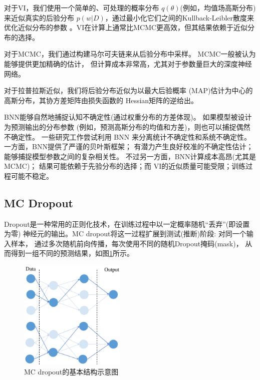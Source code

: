 对于VI，我们使用一个简单的、可处理的概率分布
$q(\theta)$(例如，均值场高斯分布)来近似真实的后验分布
$p(w|D)$，通过最小化它们之间的Kullback-Leibler散度\cite{1320776d-9e76-337e-a755-73010b6e4b64}来优化近似分布的参数
。VI在计算上通常比MCMC更高效，但其结果依赖于近似分布的选择。

对于MCMC，我们通过构建马尔可夫链来从后验分布中采样。
MCMC一般被认为能够提供更加精确的估计，
但计算成本非常高，尤其对于参数量巨大的深度神经网络。

对于拉普拉斯近似，我们将后验分布近似为以最大后验概率
(MAP)估计为中心的高斯分布，其协方差矩阵由损失函数的
Hessian矩阵的逆给出。

BNN能够自然地捕捉认知不确定性(通过权重分布的方差体现)。
如果模型被设计为预测输出的分布参数
(例如，预测高斯分布的均值和方差)，则也可以捕捉偶然不确定性。
一些研究工作尝试利用 BNN 来分离统计不确定性和系统不确定性。
一方面，BNN提供了严谨的贝叶斯框架；
有潜力产生良好校准的不确定性估计；
能够捕捉模型参数之间的复杂相关性。
不过另一方面，BNN计算成本高昂(尤其是MCMC)；
结果可能依赖于先验分布的选择；而
VI的近似质量可能受限；训练过程可能不稳定。

\subsection{MC Dropout}

Dropout是一种常用的正则化技术，在训练过程中以一定概率随机“丢弃”(即设置为零)
神经元的输出。MC dropout将这一过程扩展到测试(推断)阶段: 对同一个输入样本，
通过多次随机前向传播，每次使用不同的随机Dropout掩码(mask)，
从而得到一组不同的预测结果，如图\ref{mc_dropout}所示。


\begin{figure}[htbp]
    \centering
    \includegraphics[width=0.45\textwidth]{figures/MonteCarloDropout.pdf}
    \caption{MC dropout的基本结构示意图\cite{DBLP:journals/corr/abs-2011-06225}}
    \label{mc_dropout}
\end{figure}

